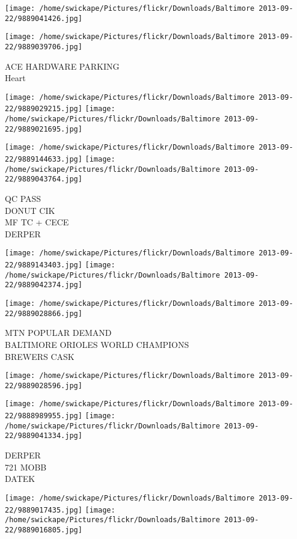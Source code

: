 \documentclass[10pt,letterpaper]{article}
\begin{document}
\texttt{[image: /home/swickape/Pictures/flickr/Downloads/Baltimore 2013-09-22/9889041426.jpg]}

\vspace{0.25in}
\texttt{[image: /home/swickape/Pictures/flickr/Downloads/Baltimore 2013-09-22/9889039706.jpg]}

ACE HARDWARE PARKING\\
Heart
\pagebreak

\texttt{[image: /home/swickape/Pictures/flickr/Downloads/Baltimore 2013-09-22/9889029215.jpg]}
\texttt{[image: /home/swickape/Pictures/flickr/Downloads/Baltimore 2013-09-22/9889021695.jpg]}

\texttt{[image: /home/swickape/Pictures/flickr/Downloads/Baltimore 2013-09-22/9889144633.jpg]}
\texttt{[image: /home/swickape/Pictures/flickr/Downloads/Baltimore 2013-09-22/9889043764.jpg]}

QC PASS\\
DONUT CIK\\
MF TC + CECE\\
DERPER
\pagebreak

\texttt{[image: /home/swickape/Pictures/flickr/Downloads/Baltimore 2013-09-22/9889143403.jpg]}
\texttt{[image: /home/swickape/Pictures/flickr/Downloads/Baltimore 2013-09-22/9889042374.jpg]}

\texttt{[image: /home/swickape/Pictures/flickr/Downloads/Baltimore 2013-09-22/9889028866.jpg]}

MTN POPULAR DEMAND\\
BALTIMORE ORIOLES WORLD CHAMPIONS\\
BREWERS CASK
\pagebreak

\texttt{[image: /home/swickape/Pictures/flickr/Downloads/Baltimore 2013-09-22/9889028596.jpg]}

\vspace{0.25in}
\texttt{[image: /home/swickape/Pictures/flickr/Downloads/Baltimore 2013-09-22/9888989955.jpg]}
\texttt{[image: /home/swickape/Pictures/flickr/Downloads/Baltimore 2013-09-22/9889041334.jpg]}

DERPER\\
721 MOBB\\
DATEK
\pagebreak

\texttt{[image: /home/swickape/Pictures/flickr/Downloads/Baltimore 2013-09-22/9889017435.jpg]}
\texttt{[image: /home/swickape/Pictures/flickr/Downloads/Baltimore 2013-09-22/9889016805.jpg]}
\end{document}
